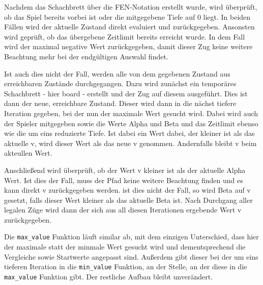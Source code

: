 Nachdem das Schachbrett über die FEN-Notation erstellt wurde, wird
überprüft, ob das Spiel bereits vorbei ist oder die mitgegebene Tiefe
auf 0 liegt. In beiden Fällen wird der aktuelle Zustand direkt evaluiert
und zurückgegeben. Ansonsten wird geprüft, ob das übergebene Zeitlimit
bereits erreicht wurde. In dem Fall wird der maximal negative Wert
zurückgegeben, damit dieser Zug keine weitere Beachtung mehr bei der
endgültigen Auswahl findet.

Ist auch dies nicht der Fall, werden alle von dem gegebenen Zustand aus
erreichbaren Zustände durchgegangen. Dazu wird zunächst ein temporäres
Schachbrett - hier board - erstellt und der Zug auf diesem ausgeführt.
Dies ist dann der neue, erreichbare Zustand. Dieser wird dann in die
nächst tiefere Iteration gegeben, bei der nun der maximale Wert gesucht
wird. Dabei wird auch der Spieler mitgegeben sowie die Werte Alpha und
Beta und das Zeitlimit ebenso wie die um eins reduzierte Tiefe. Ist
dabei ein Wert dabei, der kleiner ist als das aktuelle v, wird dieser
Wert als das neue v genommen. Andernfalls bleibt v beim akteullen Wert.

Anschließend wird überprüft, ob der Wert v kleiner ist als der aktuelle
Alpha Wert. Ist dies der Fall, muss der Pfad keine weitere Beachtung
finden und es kann direkt v zurückgegeben werden. ist dies nicht der
Fall, so wird Beta auf v gesetzt, falls dieser Wert kleiner als das
aktuelle Beta ist. Nach Durchgang aller legalen Züge wird dann der sich
aus all diesen Iterationen ergebende Wert v zurückgegeben.

Die \texttt{max\_value} Funktion läuft similar ab, mit dem einzigen
Unterschied, dass hier der maximale statt der minmale Wert gesucht wird
und dementsprechend die Vergleiche sowie Startwerte angepasst sind.
Außerdem gibt dieser bei der um eins tieferen Iteration in die
\texttt{min\_value} Funktion, an der Stelle, an der diese in die
\texttt{max\_value} Funktion gibt. Der restliche Aufbau bleibt
unverändert.

